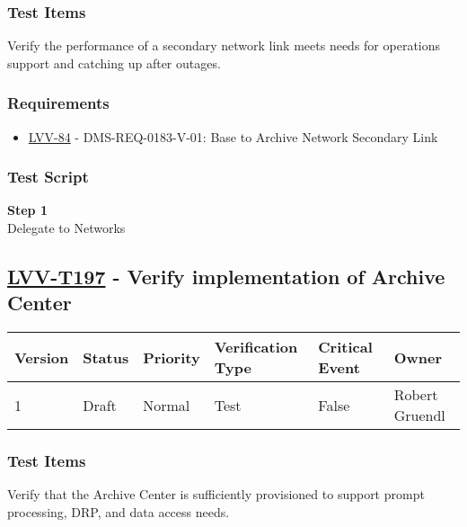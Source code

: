 \subsubsection{Test Items}\label{test-items-55}

Verify the performance of a secondary network link meets needs for
operations support and catching up after outages.

\subsubsection{Requirements}\label{requirements-55}

\begin{itemize}
\tightlist
\item
  \href{https://jira.lsstcorp.org/browse/LVV-84}{LVV-84} -
  DMS-REQ-0183-V-01: Base to Archive Network Secondary Link
\end{itemize}

\subsubsection{Test Script}\label{test-script-55}

\textbf{Step 1}\\
Delegate to Networks\\[2\baselineskip]

\hypertarget{lvv-t197---verify-implementation-of-archive-center}{\subsection{\texorpdfstring{\href{https://jira.lsstcorp.org/secure/Tests.jspa\#/testCase/LVV-T197}{LVV-T197}
- Verify implementation of Archive
Center}{LVV-T197 - Verify implementation of Archive Center}}\label{lvv-t197---verify-implementation-of-archive-center}}

\begin{longtable}[]{@{}llllll@{}}
\toprule
Version & Status & Priority & Verification Type & Critical Event &
Owner\tabularnewline
\midrule
\endhead
1 & Draft & Normal & Test & False & Robert Gruendl\tabularnewline
\bottomrule
\end{longtable}

\subsubsection{Test Items}\label{test-items-56}

Verify that the Archive Center is sufficiently provisioned to support
prompt processing, DRP, and data access needs.

